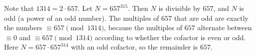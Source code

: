 Note that $1314=2\cdot657$. Let $N=657^{315}$. Then $N$ is divisible by $657$, and $N$ is odd (a power of an odd number). The multiples of $657$ that are odd are exactly the numbers $\equiv657\pmod{1314}$, because the multiples of $657$ alternate between $\equiv0$ and $\equiv657\pmod{1314}$ according to whether the cofactor is even or odd. Here $N=657\cdot657^{314}$ with an odd cofactor, so the remainder is $\boxed{657}$.
